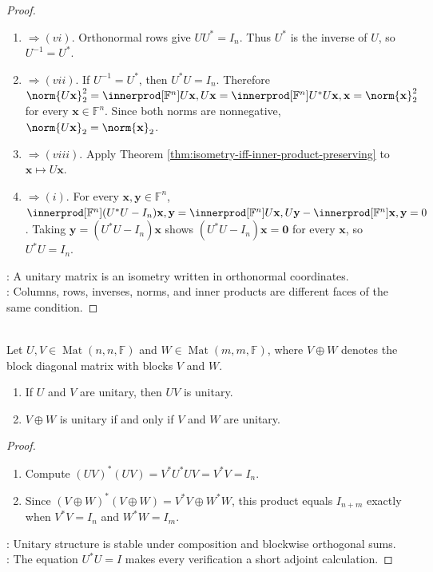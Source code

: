 \begin{theorem}
\begin{proof}
\begin{enumerate}[label=(\roman*).]
\item[$(v)$]$\Rightarrow (vi)$. Orthonormal rows give $UU^*=I_n$. Thus $U^*$ is the inverse of $U$, so $U^{-1}=U^*$.
\item[$(vi)$]$\Rightarrow (vii)$. If $U^{-1}=U^*$, then $U^*U=I_n$. Therefore $\norm{U\mathbf{x}}_2^2 =\innerprod[\mathbb{F}^n]{U\mathbf{x},U\mathbf{x}} =\innerprod[\mathbb{F}^n]{U^*U\mathbf{x},\mathbf{x}} =\norm{\mathbf{x}}_2^2$ for every $\mathbf{x}\in\mathbb{F}^n$. Since both norms are nonnegative, $\norm{U\mathbf{x}}_2=\norm{\mathbf{x}}_2$.
\item[$(vii)$]$\Rightarrow (viii)$. Apply Theorem \ref{thm:isometry-iff-inner-product-preserving} to $\mathbf{x}\mapsto U\mathbf{x}$.
\item[$(viii)$]$\Rightarrow (i)$. For every $\mathbf{x},\mathbf{y}\in\mathbb{F}^n$, $\innerprod[\mathbb{F}^n]{(U^*U-I_n)\mathbf{x},\mathbf{y}} =\innerprod[\mathbb{F}^n]{U\mathbf{x},U\mathbf{y}}-\innerprod[\mathbb{F}^n]{\mathbf{x},\mathbf{y}} =0$. Taking $\mathbf{y}=(U^*U-I_n)\mathbf{x}$ shows $(U^*U-I_n)\mathbf{x}=\mathbf{0}$ for every $\mathbf{x}$, so $U^*U=I_n$.
\end{enumerate}
: A unitary matrix is an isometry written in orthonormal coordinates.\\
: Columns, rows, inverses, norms, and inner products are different faces of the same condition.
\end{proof}
\end{theorem}

\begin{proposition} \label{prop:algebra-of-unitary-matrices} \\
Let $U,V\in\operatorname{Mat}(n,n,\mathbb{F})$ and $W\in\operatorname{Mat}(m,m,\mathbb{F})$, where $V\oplus W$ denotes the block diagonal matrix with blocks $V$ and $W$.
\begin{enumerate}[label=\roman*.]
\setlength{\itemsep}{0pt}
\item If $U$ and $V$ are unitary, then $UV$ is unitary.
\item $V\oplus W$ is unitary if and only if $V$ and $W$ are unitary.
\end{enumerate}
\begin{proof}
\begin{enumerate}[label=(\roman*)]
\setlength{\itemsep}{0pt}
\item Compute $(UV)^*(UV)=V^*U^*UV=V^*V=I_n$.
\item Since $(V\oplus W)^*(V\oplus W)=V^*V\oplus W^*W$, this product equals $I_{n+m}$ exactly when $V^*V=I_n$ and $W^*W=I_m$.
\end{enumerate}
: Unitary structure is stable under composition and blockwise orthogonal sums.\\
: The equation $U^*U=I$ makes every verification a short adjoint calculation.
\end{proof}
\end{proposition}

